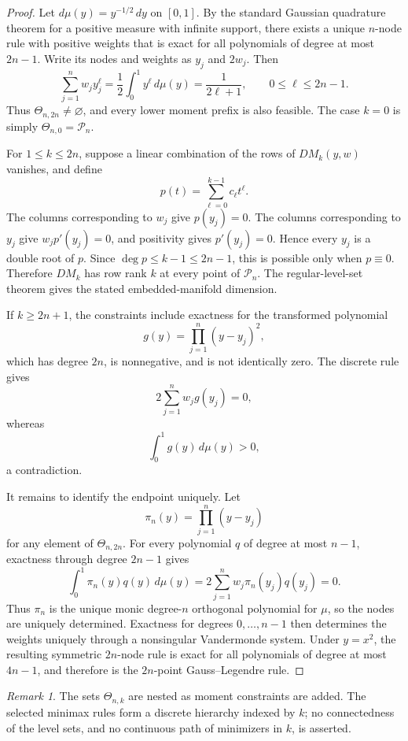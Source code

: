 \documentclass[preprint,12pt]{elsarticle}
\theoremstyle{remark}
\newtheorem{remark}[theorem]{Remark}
\begin{document}
\begin{proof}
Let \(d\mu(y)=y^{-1/2}\,dy\) on \([0,1]\). By the standard Gaussian
quadrature theorem for a positive measure with infinite support, there
exists a unique \(n\)-node rule with positive weights that is exact for
all polynomials of degree at most \(2n-1\). Write its nodes and weights
as \(y_j\) and \(2w_j\). Then
\[
\sum_{j=1}^{n}w_jy_j^\ell
=
\frac{1}{2}\int_0^1y^\ell\,d\mu(y)
=
\frac{1}{2\ell+1},
\qquad
0\leq\ell\leq2n-1.
\]
Thus \(\Theta_{n,2n}\neq\varnothing\), and every lower moment prefix is
also feasible. The case \(k=0\) is simply
\(\Theta_{n,0}=\mathcal P_n\).

For \(1\leq k\leq2n\), suppose a linear combination of the rows of
\(DM_k(y,w)\) vanishes, and define
\[
p(t)=\sum_{\ell=0}^{k-1}c_\ell t^\ell.
\]
The columns corresponding to \(w_j\) give \(p(y_j)=0\). The columns
corresponding to \(y_j\) give \(w_jp'(y_j)=0\), and positivity gives
\(p'(y_j)=0\). Hence every \(y_j\) is a double root of \(p\). Since
\(\deg p\leq k-1\leq2n-1\), this is possible only when \(p\equiv0\).
Therefore \(DM_k\) has row rank \(k\) at every point of
\(\mathcal P_n\). The regular-level-set theorem gives the stated
embedded-manifold dimension.

If \(k\geq2n+1\), the constraints include exactness for the transformed
polynomial
\[
g(y)=\prod_{j=1}^{n}(y-y_j)^2,
\]
which has degree \(2n\), is nonnegative, and is not identically zero.
The discrete rule gives
\[
2\sum_{j=1}^{n}w_jg(y_j)=0,
\]
whereas
\[
\int_0^1g(y)\,d\mu(y)>0,
\]
a contradiction.

It remains to identify the endpoint uniquely. Let
\[
\pi_n(y)=\prod_{j=1}^{n}(y-y_j)
\]
for any element of \(\Theta_{n,2n}\). For every polynomial \(q\) of
degree at most \(n-1\), exactness through degree \(2n-1\) gives
\[
\int_0^1\pi_n(y)q(y)\,d\mu(y)
=
2\sum_{j=1}^{n}w_j\pi_n(y_j)q(y_j)
=
0.
\]
Thus \(\pi_n\) is the unique monic degree-\(n\) orthogonal polynomial
for \(\mu\), so the nodes are uniquely determined. Exactness for
degrees \(0,\ldots,n-1\) then determines the weights uniquely through a
nonsingular Vandermonde system. Under \(y=x^2\), the resulting
symmetric \(2n\)-node rule is exact for all polynomials of degree at
most \(4n-1\), and therefore is the \(2n\)-point Gauss--Legendre rule.
\end{proof}

\begin{remark}
The sets \(\Theta_{n,k}\) are nested as moment constraints are added.
The selected minimax rules form a discrete hierarchy indexed by \(k\);
no connectedness of the level sets, and no continuous path of
minimizers in \(k\), is asserted.
\end{remark}
\end{document}
